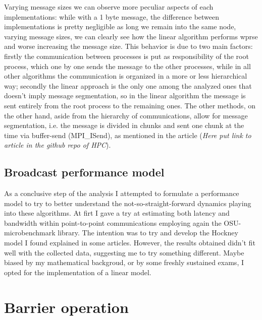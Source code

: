 \documentclass{article}
\begin{document}
	Varying message sizes we can observe more peculiar aspects of each implementations: while with a 1 byte message, the difference between implementations is pretty negligible as long we remain into the same node, varying message sizes, we can clearly see how the linear algorithm performs wprse and worse increasing the message size.
	This behavior is due to two main factors: firstly the communication between processes is put as responsibility of the root process, which one by one sends the message to the other processes, while in all other algorithms the communication is organized in a more or less hierarchical way; secondly the linear approach is the only one among the analyzed ones that doesn't imply message segmentation, so in the linear algorithm the message is sent entirely from the root process to the remaining ones. The other methods, on the other hand, aside from the hierarchy of communications, allow for message segmentation, i.e. the message is divided in chunks and sent one chunk at the time via buffer-send (MPI\_ISend), as mentioned in the article (\textit{Here put link to article in the github repo of HPC}).
	
	\subsection{Broadcast performance model}
	As a conclusive step of the analysis I attempted to formulate a performance model to try to better understand the not-so-straight-forward dynamics playing into these algorithms. 
	At firt I gave a try at estimating both latency and bandwidth within point-to-point communications employing again the OSU-microbenchmark library. The intention was to try and develop the Hockney model I found explained in some articles. However, the results obtained didn't fit well with the collected data, suggesting me to try something different. Maybe biased by my mathematical backgroud, or by some freshly sustained exams, I opted for the implementation of a linear model.
	
	
	
	\section{Barrier operation}
	
\end{document}
